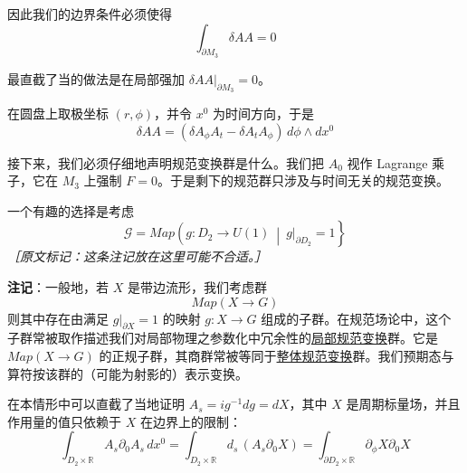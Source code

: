 因此我们的边界条件必须使得
\begin{equation}
  \int_{\partial M_3}\delta AA=0
  \tag{2.300}
  \label{eq:2.300}
\end{equation}

最直截了当的做法是在局部强加 $\delta AA|_{\partial M_3}=0$。

在圆盘上取极坐标 $(r,\phi)$，并令 $x^0$ 为时间方向，于是
\begin{equation}
  \delta AA=(\delta A_\phi A_t-\delta A_t A_\phi)\,d\phi\wedge dx^0
  \tag{2.301}
  \label{eq:2.301}
\end{equation}

接下来，我们必须仔细地声明规范变换群是什么。我们把 $A_0$ 视作 Lagrange 乘子，它在 $M_3$ 上强制 $F=0$。于是剩下的规范群只涉及与时间无关的规范变换。

一个有趣的选择是考虑
\begin{equation}
  \mathcal{G}=Map\left(g:D_2\to U(1)\ \middle|\ g|_{\partial D_2}=1\right\}
  \tag{2.302}
  \label{eq:2.302}
\end{equation}
{\small\itshape ［原文标记：这条注记放在这里可能不合适。］}

\textbf{注记}：一般地，若 $X$ 是带边流形，我们考虑群
\begin{equation}
  Map(X\to G)
  \tag{2.303}
  \label{eq:2.303}
\end{equation}
则其中存在由满足 $g|_{\partial X}=1$ 的映射 $g:X\to G$ 组成的子群。在规范场论中，这个子群常被取作描述我们对局部物理之参数化中冗余性的\underline{局部规范变换}群。它是 $Map(X\to G)$ 的正规子群，其商群常被等同于\underline{整体规范变换}群。我们预期态与算符按该群的（可能为射影的）表示变换。

在本情形中可以直截了当地证明 $A_s=ig^{-1}dg=dX$，其中 $X$ 是周期标量场，并且作用量的值只依赖于 $X$ 在边界上的限制：
\begin{equation}
  \int_{D_2\times\mathbb{R}}A_s\partial_0A_s\,dx^0
  =\int_{D_2\times\mathbb{R}}d_s\,(A_s\partial_0X)
  =\int_{\partial D_2\times\mathbb{R}}\partial_\phi X\partial_0X
  \tag{2.304}
  \label{eq:2.304}
\end{equation}

